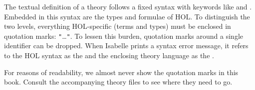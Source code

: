\begin{isabellebody}
\begin{isamarkuptext}
The textual definition of a theory follows a fixed syntax with keywords like
 and .  Embedded in this syntax are
the types and formulae of HOL.  To distinguish the two levels, everything
HOL-specific (terms and types) must be enclosed in quotation marks:
\texttt{"}\dots\texttt{"}. To lessen this burden, quotation marks around a
single identifier can be dropped.  When Isabelle prints a syntax error
message, it refers to the HOL syntax as the  and the
enclosing theory language as the .
\sem
\begin{warn}
For reasons of readability, we almost never show the quotation marks in this
book. Consult the accompanying theory files to see where they need to go.
\end{warn}
\endsem
\end{isamarkuptext}%
\isamarkuptrue%
%
\isadelimtheory
%
\endisadelimtheory
%
\isatagtheory
%
\endisatagtheory
{\isafoldtheory}%
%
\isadelimtheory
%
\endisadelimtheory
\end{isabellebody}%
